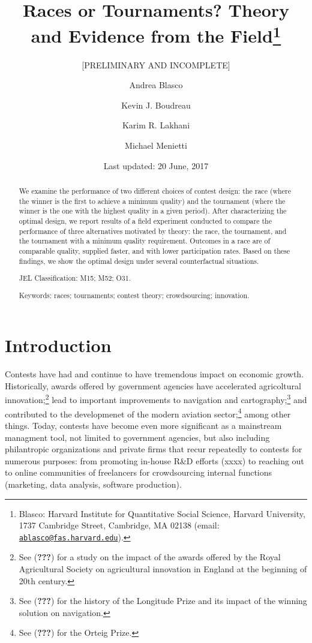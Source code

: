 \documentclass[11pt, titlepage]{article}
\title{Races or Tournaments? Theory and Evidence from the Field\thanks{Blasco: Harvard Institute for Quantitative Social Science, Harvard
University, 1737 Cambridge Street, Cambridge, MA 02138 (email:
\href{mailto:ablasco@fas.harvard.edu}{\nolinkurl{ablasco@fas.harvard.edu}}).}}
\subtitle{{[}PRELIMINARY AND INCOMPLETE{]}}
\author{Andrea Blasco \and Kevin J. Boudreau \and Karim R. Lakhani \and Michael Menietti}
\date{Last updated: 20 June, 2017}
\begin{document}
\maketitle
\begin{abstract}
We examine the performance of two different choices of contest design:
the race (where the winner is the first to achieve a minimum quality)
and the tournament (where the winner is the one with the highest quality
in a given period). After characterizing the optimal design, we report
results of a field experiment conducted to compare the performance of
three alternatives motivated by theory: the race, the tournament, and
the tournament with a minimum quality requirement. Outcomes in a race
are of comparable quality, supplied faster, and with lower participation
rates. Based on these findings, we show the optimal design under several
counterfactual situations.

\smallskip\noindent 
JEL Classification: M15; M52; O31.

\smallskip\noindent 
Keywords: races; tournaments; contest theory; crowdsourcing; innovation.
\end{abstract}


\clearpage

\section{Introduction}\label{introduction}

Contests have had and continue to have tremendous impact on economic
growth. Historically, awards offered by government agencies have
accelerated agricoltural innovation;\footnote{See ({\textbf{???}}) for a
  study on the impact of the awards offered by the Royal Agricultural
  Society on agricultural innovation in England at the beginning of 20th
  century.} lead to important improvements to navigation and
cartography;\footnote{See ({\textbf{???}}) for the history of the
  Longitude Prize and its impact of the winning solution on navigation.}
and contributed to the developmenet of the modern aviation
sector;\footnote{See ({\textbf{???}}) for the Orteig Prize.} among other
things. Today, contests have become even more significant as a
mainstream managment tool, not limited to government agencies, but also
including philantropic organizations and private firms that recur
repeatedly to contests for numerous purposes: from promoting in-house
R\&D efforts (xxxx) to reaching out to online communities of freelancers
for crowdsourcing internal functions (marketing, data analysis, software
production).
\end{document}
